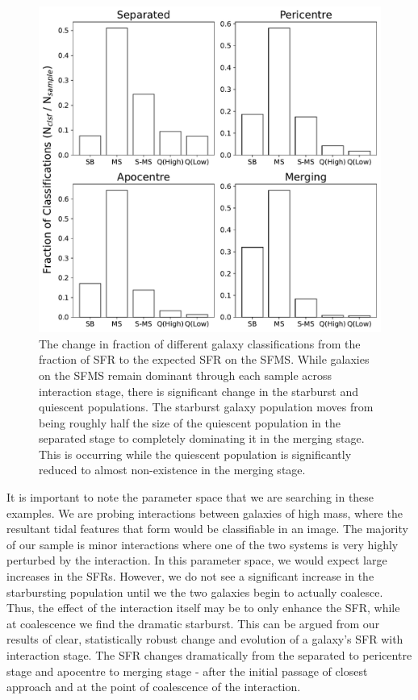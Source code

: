 \begin{figure}
\centering
\includegraphics[width=\textwidth]{Chapter3/figures/sfr-clsf-bar.pdf}
\caption[The change in fraction of different galaxy classifications from the fraction of SFR to the expected SFR on the SFMS.]{The change in fraction of different galaxy classifications from the fraction of SFR to the expected SFR on the SFMS. While galaxies on the SFMS remain dominant through each sample across interaction stage, there is significant change in the starburst and quiescent populations. The starburst galaxy population moves from being roughly half the size of the quiescent population in the separated stage to completely dominating it in the merging stage. This is occurring while the quiescent population is significantly reduced to almost non-existence in the merging stage.}
\label{fig:sfr-clsf-bar}
\end{figure}

It is important to note the parameter space that we are searching in these examples. We are probing interactions between galaxies of high mass, where the resultant tidal features that form would be classifiable in an image. The majority of our sample is minor interactions where one of the two systems is very highly perturbed by the interaction. In this parameter space, we would expect large increases in the SFRs. However, we do not see a significant increase in the starbursting population until we the two galaxies begin to actually coalesce. Thus, the effect of the interaction itself may be to only enhance the SFR, while at coalescence we find the dramatic starburst. This can be argued from our results of clear, statistically robust change and evolution of a galaxy's SFR with interaction stage. The SFR changes dramatically from the separated to pericentre stage and apocentre to merging stage - after the initial passage of closest approach and at the point of coalescence of the interaction.

